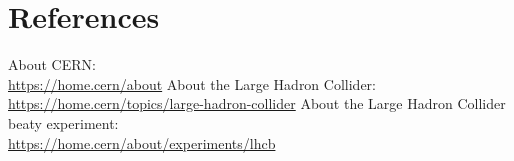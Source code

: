 \documentclass[12pt]{article}
\begin{document}
	
	\section{References}
	
	\begin{thebibliography}{asd}
		 About CERN: \\
			\url{https://home.cern/about}
		 About the Large Hadron Collider: \\
			\url{https://home.cern/topics/large-hadron-collider}
		 About the Large Hadron Collider beaty experiment: \\
			\url{https://home.cern/about/experiments/lhcb}
	\end{thebibliography}
\end{document}
